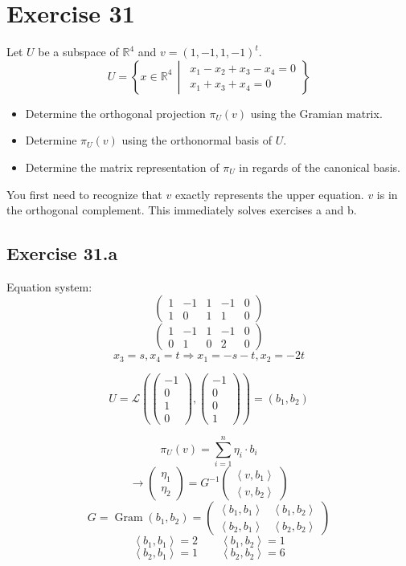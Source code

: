 \documentclass[a4paper]{article}
\theoremstyle{definition}
\newcommand\setdef[2]{\left\{#1\,\middle|\,#2\right\}}
\newcommand\fun[1]{\left\langle{#1}\right\rangle}
\begin{document}
\section{Exercise 31}
\begin{ex}
  Let $U$ be a subspace of $\mathbb R^4$ and $v = (1, -1, 1, -1)^t$.
  \[ U = \setdef{x \in \mathbb R^4}{\substack{x_1 - x_2 + x_3 - x_4 = 0 \\ x_1 + x_3 + x_4 = 0}} \]
  \begin{itemize}
    \item Determine the orthogonal projection $\pi_U(v)$ using the Gramian matrix.
    \item Determine $\pi_U(v)$ using the orthonormal basis of $U$.
    \item Determine the matrix representation of $\pi_U$ in regards of the canonical basis.
  \end{itemize}
\end{ex}

You first need to recognize that $v$ exactly represents the upper equation.
$v$ is in the orthogonal complement. This immediately solves exercises a and b.

\subsection{Exercise 31.a}
Equation system:
\[
  \begin{pmatrix}
    1 & -1 & 1 & -1 & 0 \\
    1 & 0 & 1 & 1 & 0
  \end{pmatrix}
\] \[
  \begin{pmatrix}
    1 & -1 & 1 & -1 & 0 \\
    0 & 1 & 0 & 2 & 0
  \end{pmatrix}
\]
\[ x_3 = s, x_4 = t \Rightarrow x_1 = -s-t, x_2 = -2t \]

\[ U = \mathcal L\left(\begin{pmatrix} -1 \\ 0 \\ 1 \\ 0 \end{pmatrix}, \begin{pmatrix} -1 \\ 0 \\ 0 \\ 1 \end{pmatrix}\right) = (b_1, b_2) \]

\[ \pi_U(v) = \sum_{i=1}^n \eta_i \cdot b_i \]
\[ \rightarrow \begin{pmatrix} \eta_1 \\ \eta_2 \end{pmatrix} = G^{-1} \begin{pmatrix} \fun{v, b_1} \\ \fun{v, b_2} \end{pmatrix} \]
\[
  G = \operatorname{Gram}(b_1, b_2) = \begin{pmatrix}
    \fun{b_1, b_1} & \fun{b_1, b_2} \\
    \fun{b_2, b_1} & \fun{b_2, b_2}
  \end{pmatrix}
\] \[
  \fun{b_1, b_1} = 2 \qquad \fun{b_1, b_2} = 1
\] \[
  \fun{b_2, b_1} = 1 \qquad \fun{b_2, b_2} = 6
\]
\end{document}

